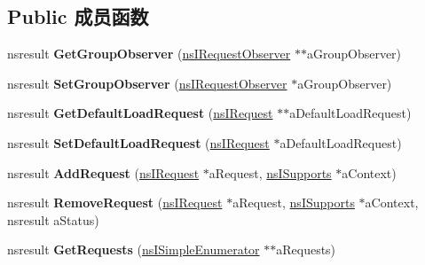 \subsection*{Public 成员函数}
\begin{DoxyCompactItemize}
\item 
\mbox{\label{interfacens_i_load_group_a0f27644ca241b7109f1b4514f1db318c}} 
nsresult {\bfseries Get\+Group\+Observer} (\hyperlink{interfacens_i_request_observer}{ns\+I\+Request\+Observer} $\ast$$\ast$a\+Group\+Observer)
\item 
\mbox{\label{interfacens_i_load_group_a08e072e7b8922c322ac7f0b8a302ef03}} 
nsresult {\bfseries Set\+Group\+Observer} (\hyperlink{interfacens_i_request_observer}{ns\+I\+Request\+Observer} $\ast$a\+Group\+Observer)
\item 
\mbox{\label{interfacens_i_load_group_a2aea38c39a9bb655e975d8f2dcebf914}} 
nsresult {\bfseries Get\+Default\+Load\+Request} (\hyperlink{interfacens_i_request}{ns\+I\+Request} $\ast$$\ast$a\+Default\+Load\+Request)
\item 
\mbox{\label{interfacens_i_load_group_a72864f3c1ad6dd3f32e867b60e5d78e4}} 
nsresult {\bfseries Set\+Default\+Load\+Request} (\hyperlink{interfacens_i_request}{ns\+I\+Request} $\ast$a\+Default\+Load\+Request)
\item 
\mbox{\label{interfacens_i_load_group_af168b6ad9d53c3ed2199a90aa64ff96a}} 
nsresult {\bfseries Add\+Request} (\hyperlink{interfacens_i_request}{ns\+I\+Request} $\ast$a\+Request, \hyperlink{interfacens_i_supports}{ns\+I\+Supports} $\ast$a\+Context)
\item 
\mbox{\label{interfacens_i_load_group_ad1a2242714aea3505ee99f2383d0327c}} 
nsresult {\bfseries Remove\+Request} (\hyperlink{interfacens_i_request}{ns\+I\+Request} $\ast$a\+Request, \hyperlink{interfacens_i_supports}{ns\+I\+Supports} $\ast$a\+Context, nsresult a\+Status)
\item 
\mbox{\label{interfacens_i_load_group_a9e910cd5013644f45060be59a9e07880}} 
nsresult {\bfseries Get\+Requests} (\hyperlink{interfacens_i_simple_enumerator}{ns\+I\+Simple\+Enumerator} $\ast$$\ast$a\+Requests)
$$
\end{DoxyCompactItemize}
